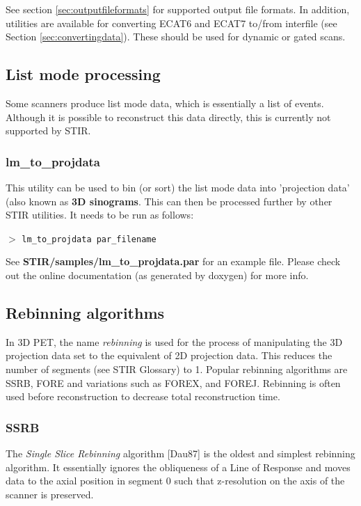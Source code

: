 \documentclass{article}
\newcommand{\cmdline}[1]{\par \noindent $>$ \texttt{#1}\par}
\begin{document}
See section \ref{sec:outputfileformats} for supported output file formats. In addition, 
utilities are available for converting ECAT6 and ECAT7 to/from 
interfile (see Section \ref{sec:convertingdata}). 
These should be used for dynamic 
or gated scans.


\subsection{
List mode processing}

Some scanners produce list mode data, which is essentially a 
list of events. Although it is possible to reconstruct this data 
directly, this is currently not supported by STIR. 


\subsubsection{
lm\_to\_projdata}

This utility can be used to bin (or sort) the list mode data 
into 'projection data' (also known as \textbf{3D sinograms}. 
This can then be processed further by other STIR utilities. It 
needs to be run as follows:
\cmdline{lm\_to\_projdata par\_filename}


See \textbf{STIR/samples/lm\_to\_projdata.par} for an example file. Please 
check out the online documentation (as generated by doxygen) 
for more info.


\subsection{
Rebinning algorithms}

In 3D PET, the name \textit{rebinning} is used for the 
process of manipulating the 3D projection data set to the equivalent 
of 2D projection data. This reduces the number of segments (see 
STIR Glossary) to 1. Popular rebinning algorithms are SSRB, FORE 
and variations such as FOREX, and FOREJ. Rebinning is often used 
before reconstruction to decrease total reconstruction time.


\subsubsection{
SSRB}
\label{sec:SSRB}
The \textit{Single Slice Rebinning} algorithm [Dau87] is the oldest 
and simplest rebinning algorithm. It essentially ignores the 
obliqueness of a Line of Response and moves data to the axial 
position in segment 0 such that z-resolution on the axis of the 
scanner is preserved.
\end{document}
